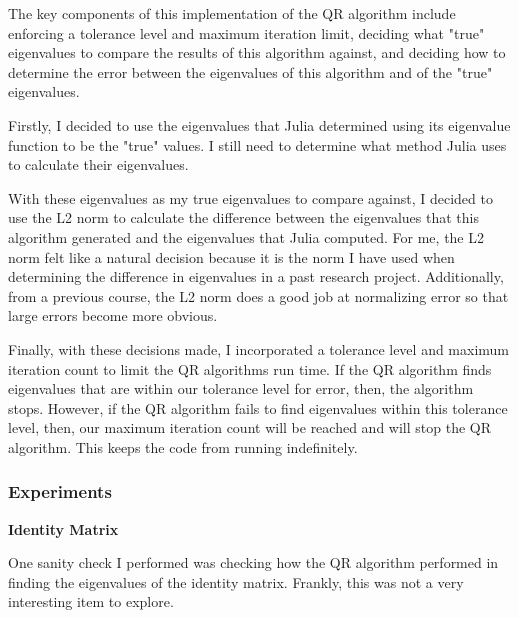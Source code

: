 \documentclass[onecolumn]{webofc}
\begin{document}
The key components of this implementation of the QR algorithm include enforcing a tolerance level and maximum iteration limit, deciding what "true" eigenvalues to compare the results of this algorithm against, and deciding how to determine the error between the eigenvalues of this algorithm and of the "true" eigenvalues.

Firstly, I decided to use the eigenvalues that Julia determined using its eigenvalue function to be the "true" values. I still need to determine what method Julia uses to calculate their eigenvalues. 

With these eigenvalues as my true eigenvalues to compare against, I decided to use the L2 norm to calculate the difference between the eigenvalues that this algorithm generated and the eigenvalues that Julia computed. For me, the L2 norm felt like a natural decision because it is the norm I have used when determining the difference in eigenvalues in a past research project. Additionally, from a previous course, the L2 norm does a good job at normalizing error so that large errors become more obvious.

Finally, with these decisions made, I incorporated a tolerance level and maximum iteration count to limit the QR algorithms run time. If the QR algorithm finds eigenvalues that are within our tolerance level for error, then, the algorithm stops. However, if the QR algorithm fails to find eigenvalues within this tolerance level, then, our maximum iteration count will be reached and will stop the QR algorithm. This keeps the code from running indefinitely.

\subsubsection*{Experiments}
\textbf{Identity Matrix}

One sanity check I performed was checking how the QR algorithm performed in finding the eigenvalues of the identity matrix. Frankly, this was not a very interesting item to explore.
\\
\end{document}
